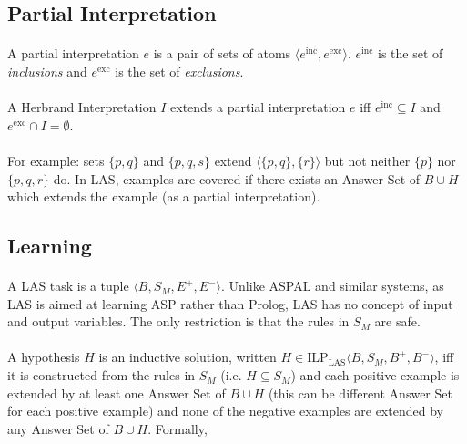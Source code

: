 \documentclass{article}
\theoremstyle{plain}
\theoremstyle{definition}
\begin{document}
\begin{multicols}{2}
\subsection{Partial Interpretation}

\paragraph{} A partial interpretation $e$ is a pair of sets of atoms $\langle e^\text{inc}, e^\text{exc}\rangle $. $e^\text{inc}$ is the set of \textit{inclusions} and $e^\text{exc}$ is the set of \textit{exclusions}.

\paragraph{} A Herbrand Interpretation $I$ extends a partial interpretation $e$ iff $e^\text{inc} \subseteq I$ and $e^\text{exc} \cap I = \emptyset$.

\paragraph{} For example: sets $\{p, q\}$ and $\{p, q, s\}$ extend $\langle \{p, q\}, \{r\} \rangle$ but not neither $\{p\}$ nor $\{p, q, r\}$ do. In LAS, examples are covered if there exists an Answer Set of $B \cup H$ which extends the example (as a partial interpretation).

\subsection{Learning}

\paragraph{} A LAS task is a tuple $\langle B, S_M, E^+, E^- \rangle$. Unlike ASPAL and similar systems, as LAS is aimed at learning ASP rather than Prolog, LAS has no concept of input and output variables. The only restriction is that the rules in $S_M$ are safe. 

\paragraph{} A hypothesis $H$ is an inductive solution, written $H \in \text{ILP}_\text{LAS}\langle B, S_M, B^+, B^- \rangle$, iff it is constructed from the rules in $S_M$ (i.e. $H \subseteq S_M$) and each positive example is extended by at least one Answer Set of $B \cup H$ (this can be different Answer Set for each positive example) and none of the negative examples are extended by any Answer Set of $B \cup H$. Formally,


\end{multicols}
\end{document}
